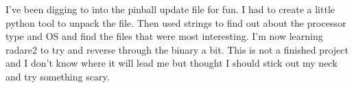 \def\abstracttitle{Down the Drain: A Look into Pinball's Embedded Systems}
\def\abstractcomment{Short Talk}
\def\abstractowner{Anna Neal}

\thispagestyle{abstract}

I've been digging to into the pinball update file for fun. I had to create a little python tool to unpack the file. Then used strings to find out about the processor type and OS and find the files that were most interesting. I'm now learning radare2 to try and reverse through the binary a bit. This is not a finished project and I don't know where it will lead me but thought I should stick out my neck and try something scary.
